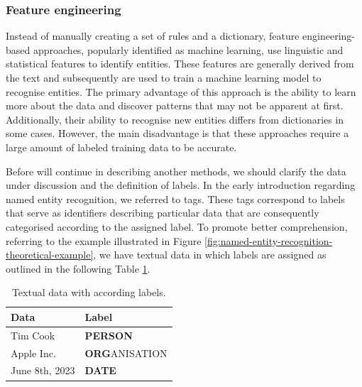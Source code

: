 \subsubsection*{Feature engineering}
\label{subsubsec:feature-engineering}
Instead of manually creating a set of rules and a dictionary, feature engineering-based approaches, popularly identified as machine learning, use linguistic and statistical features to identify entities. These features are generally derived from the text and subsequently are used to train a machine learning model to recognise entities. The primary advantage of this approach is the ability to learn more about the data and discover patterns that may not be apparent at first. Additionally, their ability to recognise new entities differs from dictionaries in some cases. However, the main disadvantage is that these approaches require a large amount of labeled training data to be accurate.

Before will continue in describing another methods, we should clarify the data under discussion and the definition of labels. In the early introduction regarding named entity recognition, we referred to tags. These tags correspond to labels that serve as identifiers describing particular data that are consequently categorised according to the assigned label. To promote better comprehension, referring to the example illustrated in Figure \ref{fig:named-entity-recognition-theoretical-example}, we have textual data in which labels are assigned as outlined in the following Table \ref{table:text-data-with-labels}.
\\
\begin{table}[ht]
    \centering
    \caption{Textual data with according labels.}
    \label{table:text-data-with-labels}
    \begin{tabular}[t]{ll}
        \hline
 Data&Label\\
        \hline
 Tim Cook&\textbf{PERSON}\\
 Apple Inc.&\textbf{ORG}ANISATION\\
 June 8th, 2023&\textbf{DATE}\\
        \hline
    \end{tabular}
\end{table}

\newpage

